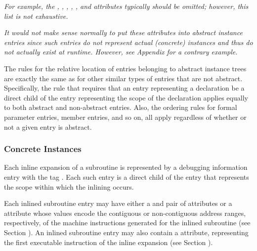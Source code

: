\textit{For example,
the \DWATlowpc,
\DWAThighpc, 
\DWATranges, 
\DWATentrypc, 
\DWATlocation,
\bb
\DWATreturnaddr{}
and
\DWATstartscope{}
\eb 
attributes typically should be omitted; however, this list is not 
exhaustive.}

\textit{It would not make sense normally to put these attributes into
abstract instance entries since such entries do not represent
actual (concrete) instances and thus do not actually exist at
run\dash time.  However, 
see Appendix  
for a contrary example.}

The rules for the relative location of entries belonging to
abstract instance trees are exactly the same as for other
similar types of entries that are not abstract. Specifically,
the rule that requires that an entry representing a declaration
be a direct child of the entry representing the scope of the
declaration applies equally to both abstract and non-abstract
entries. Also, the ordering rules for formal parameter entries,
member entries, and so on, all apply regardless of whether
or not a given entry is abstract.

\subsubsection{Concrete Instances}
\label{chap:concreteinstances}

Each inline expansion of a subroutine is represented
by a debugging information entry with the 
tag \DWTAGinlinedsubroutineTARG. Each such entry is a direct
child of the entry that represents the scope within which
the inlining occurs.

Each inlined subroutine entry may have either a 
\DWATlowpc{}
and \DWAThighpc{} pair of attributes
or a \DWATranges{}
attribute whose values encode the contiguous or non-contiguous
address ranges, respectively, of the machine instructions
generated for the inlined subroutine (see 
Section ). 
An\hypertarget{chap:DWATentrypcentryaddressofinlinedsubprogram}{}
inlined subroutine entry may 
also 
contain 
a 
\DWATentrypc{}
attribute, representing the first executable instruction of
the inline expansion (see 
Section ).


